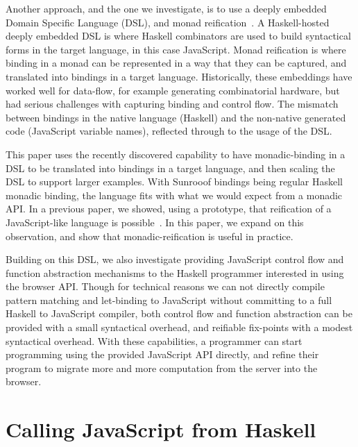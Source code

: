 \documentclass{llncs}
\begin{document}
Another approach, and the one we investigate,
is to use a deeply embedded Domain Specific Language (DSL), and
monad reification~\cite{..,..}.
A Haskell-hosted deeply embedded DSL is where Haskell combinators 
are used to build syntactical forms in the target language,
in this case JavaScript.
Monad reification is where binding in a monad can be represented
in a way that they can be captured, and translated into bindings
in a target language.
Historically, these embeddings have worked well for 
data-flow, for example generating combinatorial hardware,
but had serious challenges with capturing binding and control flow.
The mismatch between bindings in the native language (Haskell) 
and the non-native generated code (JavaScript variable names),
reflected through to the usage of the DSL.

This paper uses the recently discovered capability to have monadic-binding
in a DSL to be translated into
bindings in a target language, and then scaling the DSL to support larger examples.
With Sunrooof bindings being regular Haskell monadic binding, 
the language fits with what we would expect from a monadic API. 
In a previous paper, we showed, using a prototype,
that reification of a JavaScript-like language is possible~\cite{Farmer:12:WebDSLs}.
In this paper, we expand on this observation,
and show that monadic-reification is useful in practice.

Building on this DSL, we also investigate providing
JavaScript control flow and function abstraction mechanisms
to the Haskell programmer interested in using the browser API.
Though for technical reasons we can not directly compile
pattern matching and let-binding to JavaScript without committing
to a full Haskell to JavaScript compiler, both
control flow and function abstraction can be provided
with a small syntactical overhead, and reifiable fix-points 
with a modest syntactical overhead.
With these capabilities, a programmer can start programming
using the provided JavaScript API directly, and refine
their program to migrate more and more computation
from the server into the browser. 


\section{Calling JavaScript from Haskell}
\label{sec:js-rpc}
\end{document}
